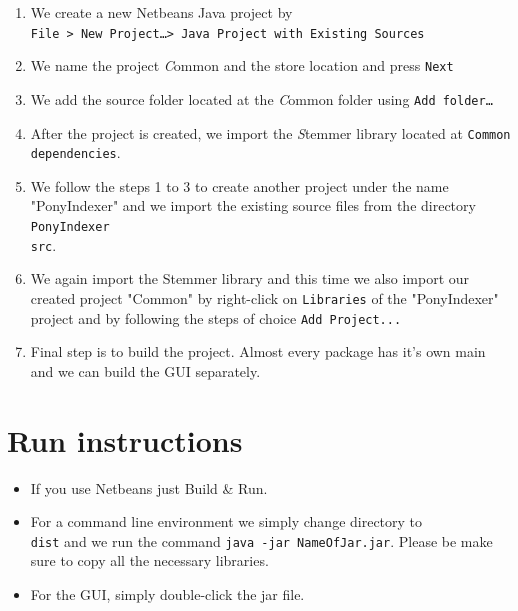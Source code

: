 \documentclass[letterpaper,twocolumn,10pt]{article}
\begin{document}
\begin{enumerate}
	\item We create a new Netbeans Java project by \\
				{\tt File > New Project\ldots  > Java Project with Existing Sources }
	\item We name the project {\emph Common} and the store location and press
				{\tt Next}
	\item We add the source folder located at the {\emph Common} folder
				using {\tt Add folder\ldots}
	\item After the project is created, we import the {\emph Stemmer} library
				located at {\tt Common\\dependencies}.
	\item We follow the steps 1 to 3 to create another project under the name "PonyIndexer" and we import the existing source files from the directory {\tt PonyIndexer\\src}.
	\item We again import the Stemmer library and this time we also import our created project "Common" by right-click on {\tt Libraries} of the "PonyIndexer" project and by following the steps of choice {\tt Add Project...}
	\item Final step is to build the project. Almost every package has it's own main and we can build the GUI separately.
\end{enumerate}

\section{Run instructions}
\begin{itemize}
	\item If you use Netbeans just Build \& Run.
	\item For a command line environment we simply change directory to {\tt \\dist} and we run the command {\tt java -jar NameOfJar.jar}. Please be make sure to copy all the necessary libraries.
	\item For the GUI, simply double-click the jar file.
\end{itemize}
\end{document}
